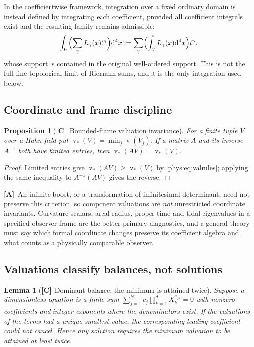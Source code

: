 \documentclass[11pt,letterpaper]{article}
\numberwithin{equation}{section}
\newtheorem{proposition}[theorem]{Proposition}
\newtheorem{lemma}[theorem]{Lemma}
\theoremstyle{definition}
\theoremstyle{remark}
\DeclareMathOperator{\val}{v}
\newcommand{\dd}{\mathrm d}
\newcommand{\TC}{\textcolor{TierC}{\textsf{\bfseries[C]}}}
\newcommand{\TA}{\textcolor{TierA}{\textsf{\bfseries[A]}}}
\begin{document}
In the coefficientwise framework, integration over a fixed ordinary domain is
instead defined by integrating each coefficient, provided all coefficient
integrals exist and the resulting family remains admissible:
\begin{equation}\label{phys:eq:coeffint}
\int_{U}\Bigl(\sum_{\gamma}L_{\gamma}(x)t^{\gamma}\Bigr)\dd^{4}x
:=\sum_{\gamma}\Bigl(\int_{U}L_{\gamma}(x)\dd^{4}x\Bigr)t^{\gamma},
\end{equation}
whose support is contained in the original well-ordered support. This is not
the full fine-topological limit of Riemann sums, and it is the only integration
used below.

\subsection{Coordinate and frame discipline}
\label{phys:sub:frames}

\begin{proposition}[\TC\ Bounded-frame valuation invariance]
\label{phys:prop:frame}
For a finite tuple $V$ over a Hahn field put
$\val_{*}(V)=\min_{j}\val(V_{j})$. If a matrix $A$ and its inverse $A^{-1}$
both have limited entries, then $\val_{*}(AV)=\val_{*}(V)$.
\end{proposition}
\begin{proof}
Limited entries give $\val_{*}(AV)\ge\val_{*}(V)$ by \eqref{phys:eq:valrules};
applying the same inequality to $A^{-1}(AV)$ gives the reverse.
\end{proof}

\TA\ An infinite boost, or a transformation of infinitesimal determinant, need
not preserve this criterion, so component valuations are \emph{not}
unrestricted coordinate invariants. Curvature scalars, areal radius, proper
time and tidal eigenvalues in a specified observer frame are the better primary
diagnostics, and a general theory must say which formal coordinate changes
preserve its coefficient algebra and what counts as a physically comparable
observer.

\subsection{Valuations classify balances, not solutions}
\label{phys:sub:balance}

\begin{lemma}[\TC\ Dominant balance: the minimum is attained twice]
\label{phys:lem:balance}
Suppose a dimensionless equation is a finite sum
$\sum_{j=1}^{N}c_{j}\prod_{k=1}^{d}X_{k}^{a_{jk}}=0$ with nonzero coefficients
and integer exponents where the denominators exist. If the valuations of the
terms had a unique smallest value, the corresponding leading coefficient could
not cancel. Hence any solution requires the minimum valuation to be attained
at least twice.
\end{lemma}
\end{document}
